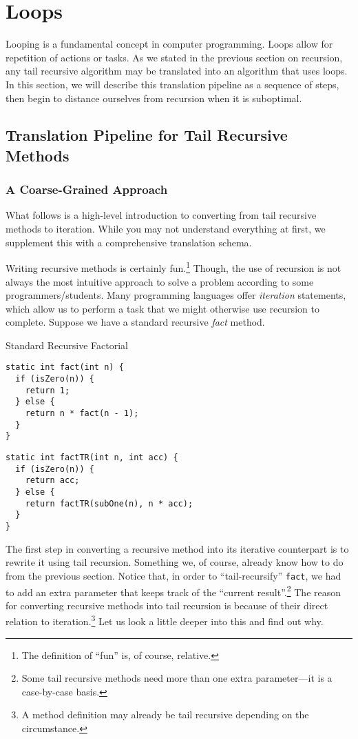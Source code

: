 \section{Loops}

Looping is a fundamental concept in computer programming. Loops allow for repetition of actions or tasks. As we stated in the previous section on recursion, any tail recursive algorithm may be translated into an algorithm that uses loops. In this section, we will describe this translation pipeline as a sequence of steps, then begin to distance ourselves from recursion when it is suboptimal.

\subsection*{Translation Pipeline for Tail Recursive Methods}
\subsubsection*{A Coarse-Grained Approach}
What follows is a high-level introduction to converting from tail recursive methods to iteration. While you may not understand everything at first, we supplement this with a comprehensive translation schema.

Writing recursive methods is certainly fun.\footnote{The definition of ``fun'' is, of course, relative.} Though, the use of recursion is not always the most intuitive approach to solve a problem according to some programmers/students. Many programming languages offer \textit{iteration} statements, which allow us to perform a task that we might otherwise use recursion to complete. Suppose we have a standard recursive \textit{fact} method. 
\begin{clrr}[]{Standard Recursive Factorial}
\begin{lstlisting}[language=MyJava]
static int fact(int n) {
  if (isZero(n)) { 
    return 1; 
  } else {
    return n * fact(n - 1);
  }
}
\end{lstlisting}
\tcblower
\begin{lstlisting}[language=MyJavaNLN]
static int factTR(int n, int acc) {
  if (isZero(n)) { 
    return acc; 
  } else {
    return factTR(subOne(n), n * acc);
  }
}
\end{lstlisting}
\end{clrr}
The first step in converting a recursive method into its iterative counterpart is to rewrite it using tail recursion. Something we, of course, already know how to do from the previous section. 
Notice that, in order to ``tail-recursify'' \texttt{fact}, we had to add an extra parameter that keeps track of the ``current result''.\footnote{Some tail recursive methods need more than one extra parameter---it is a case-by-case basis.} The reason for converting recursive methods into tail recursion is because of their direct relation to iteration.\footnote{A method definition may already be tail recursive depending on the circumstance.} Let us look a little deeper into this and find out why.

